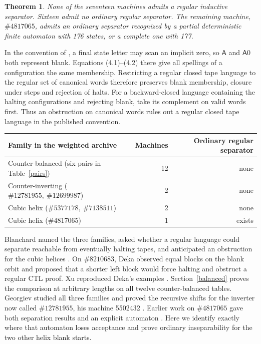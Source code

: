 \documentclass[11pt]{article}
\newtheorem{theorem}{Theorem}
\newcommand{\state}[1]{\mathsf{#1}}
\begin{document}
\begin{theorem}\label{main}
None of the seventeen machines admits a regular inductive separator. Sixteen admit no ordinary regular separator. The remaining machine, \(\#4817065\), admits an ordinary separator recognized by a partial deterministic finite automaton with 176 states, or a complete one with 177.
\end{theorem}

In the convention of \cite[\S4.6.2]{bb5}, a final state letter may scan an implicit zero, so \(\state A\) and \(\state A0\) both represent blank. Equations (4.1)--(4.2) there give all spellings of a configuration the same membership. Restricting a regular closed tape language to the regular set of canonical words therefore preserves blank membership, closure under steps and rejection of halts. For a backward-closed language containing the halting configurations and rejecting blank, take its complement on valid words first. Thus an obstruction on canonical words rules out a regular closed tape language in the published convention.

\begin{center}
\begin{tabular}{@{}lrr@{}}
\toprule
Family in the weighted archive & Machines & Ordinary regular separator\\
\midrule
Counter-balanced (six pairs in Table~\ref{pairs}) & 12 & none\\
Counter-inverting (\(\#12781955,\ \#12699987\)) & 2 & none\\
Cubic helix (\(\#5377178,\ \#7138511\)) & 2 & none\\
Cubic helix (\(\#4817065\)) & 1 & exists\\
\bottomrule
\end{tabular}
\end{center}

Blanchard named the three families, asked whether a regular language could separate reachable from eventually halting tapes, and anticipated an obstruction for the cubic helices \cite{holdouts}. On \(\#8210683\), Deka observed equal blocks on the blank orbit and proposed that a shorter left block would force halting and obstruct a regular CTL proof. Xu reproduced Deka's examples \cite{deka}. Section~\ref{balanced} proves the comparison at arbitrary lengths on all twelve counter-balanced tables. Georgiev studied all three families and proved the recursive shifts for the inverter now called \(\#12781955\), his machine 5502432 \cite{georgiev,inverter}. Earlier work on \(\#4817065\) gave both separation results and an explicit automaton \cite{prior,cost}. Here we identify exactly where that automaton loses acceptance and prove ordinary inseparability for the two other helix blank starts.
\end{document}

